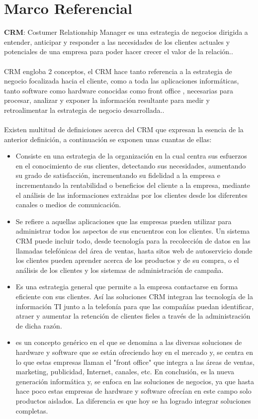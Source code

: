 \section{Marco Referencial}
%
\textbf{CRM}: Costumer Relationship Manager es una estrategia de negocios dirigida a entender, anticipar y responder a las necesidades de los clientes actuales y potenciales de una empresa para poder hacer crecer el valor de la relaci\'on..%
\\%
\\%
CRM engloba 2 conceptos, el CRM hace tanto referencia a la estrategia de negocio focalizada hacia el cliente, como a toda las aplicaciones inform\'aticas, tanto software como hardware conocidas como front office , necesarias para procesar, analizar y exponer la informaci\'on resultante para medir y retroalimentar la estrategia de negocio desarrollada..%
\\%
\\%
Existen multitud de definiciones acerca del CRM que expresan la esencia de la anterior definici\'on, a continuaci\'on se exponen unas cuantas de ellas:%
\\%
\begin{itemize}
	\item Consiste en una estrategia de la organizaci\'on en la cual centra sus esfuerzos en el conocimiento de sus clientes, detectando sus necesidades, aumentando su grado de satisfacci\'on, incrementando su fidelidad a la empresa e incrementando la rentabilidad o beneficios del cliente a la empresa, mediante el an\'alisis de las informaciones extraidas por los clientes desde los diferentes canales o medios de comunicaci\'on.
	\item Se refiere a aquellas aplicaciones que las empresas pueden utilizar para administrar todos los aspectos de sus encuentros con los clientes. Un sistema CRM puede incluir todo, desde tecnolog\'ia para la recolecci\'on de datos en las llamadas telef\'onicas del \'area de ventas, hasta sitos web de autoservicio donde los clientes pueden aprender acerca de los productos y de su compra, o el an\'alisis de los clientes y los sistemas de administraci\'on de campa\~na.
	\item Es una estrategia general que permite a la empresa contactarse en forma eficiente con sus clientes. As\'i las soluciones CRM integran las tecnolog\'ia de la informaci\'on TI junto a la telefon\'ia para que las compa\~n\'ias puedan identificar, atraer y aumentar la retenci\'on de clientes fieles a trav\'es de la administraci\'on de dicha raz\'on.
	\item es un concepto gen\'erico en el que se denomina a las diversas soluciones de hardware y software que se est\'an ofreciendo hoy en el mercado y, se centra en lo que estas empresas llaman el "front office" que integra a las \'areas de ventas, marketing, publicidad, Internet, canales, etc. En conclusi\'on, es la nueva generaci\'on inform\'atica y, se enfoca en las soluciones de negocios, ya que hasta hace poco estas empresas de hardware y software ofrec\'ian en este campo solo productos aislados. La diferencia es que hoy se ha logrado integrar soluciones completas.
\end{itemize}
